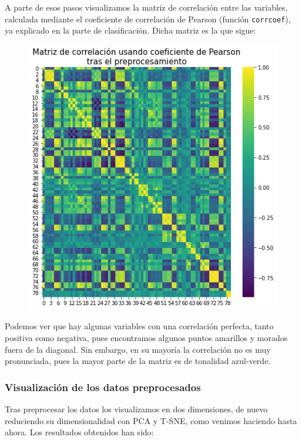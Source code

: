 \documentclass[a4]{article}
\begin{document}
A parte de esos pasos visualizamos la matriz de correlación entre las variables, calculada mediante el coeficiente de correlación de Pearson (función \lstinline|corrcoef|), ya explicado en la parte de clasificación. Dicha matriz es la que sigue: 

\begin{figure}[H]
	\centering
	\includegraphics[width=0.6\linewidth]{img/corr2}
	\caption{}
	\label{fig:corr}
\end{figure}

Podemos ver que hay algunas variables con una correlación perfecta, tanto positiva como negativa, pues encontramos algunos puntos amarillos y morados fuera de la diagonal. Sin embargo, en su mayoría la correlación no es muy pronunciada, pues la mayor parte de la matriz es de tonalidad azul-verde. 
\subsubsection{Visualización de los datos preprocesados}

Tras preprocesar los datos los visualizamos en dos dimensiones, de nuevo reduciendo su dimensionalidad con PCA y T-SNE, como venimos haciendo hasta ahora. Los resultados obtenidos han sido:
\end{document}
